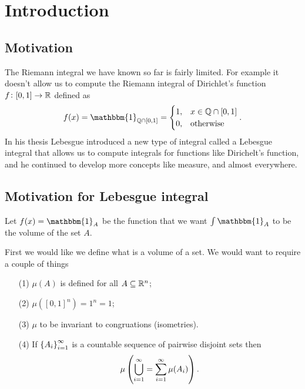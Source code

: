 \documentclass[11pt,a4paper]{article}
\begin{document}
\maketitle


\newpage
\tableofcontents
\newpage

\section{Introduction}

\subsection{Motivation}
The Riemann integral we have known so far is fairly limited.
For example it doesn't allow us to compute the Riemann integral
of Dirichlet's function $f \colon [0,1] \to \mathbb{R}$ defined as
\[
  f(x) = \mathbbm{1}_{\Q \cap [0,1]} =
  \begin{cases}
    1, &x \in \Q \cap [0,1] \\
    0, &\text{otherwise}
  \end{cases}.
\]
In his thesis Lebesgue introduced a new type of integral called
a Lebesgue integral that allows us to compute integrals for functions
like Dirichelt's function, and he continued to develop more concepts
like measure, and almost everywhere.

\subsection{Motivation for Lebesgue integral}
Let $f(x) = \mathbbm{1}_A$ be the function that 
we want $\int \mathbbm{1}_A$ to be the volume of the set $A$.

First we would like we define what is a volume of a set.
We would want to require a couple of things
\begin{enumerate}
  \item[(1)] $\mu(A)$ is defined for all $A \subseteq \mathbb{R}^n$;
  \item[(2)] $\mu([0,1]^n) = 1^n = 1$;
  \item[(3)] $\mu$ to be invariant to congruations (isometries).
  \item[(4)] If $\set{A_i}_{i=1}^{\infty}$ is a countable sequence
    of pairwise disjoint sets then
    \[
      \mu\del{\bigcup_{i=1}^{\infty} = \sum_{i=1}^{\infty} \mu(A_i)}.
    \]
\end{enumerate}
\end{document}
